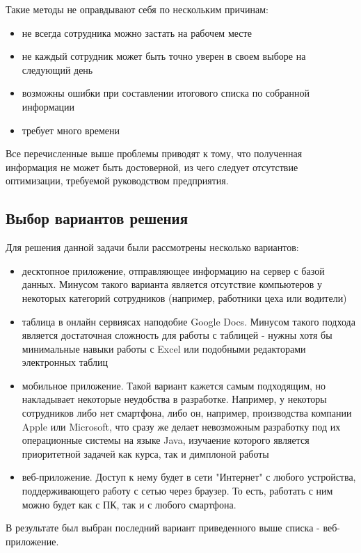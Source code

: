 \documentclass[a4paper]{article}
\begin{document}
Такие методы не оправдывают себя по нескольким причинам:
\begin{itemize}
\setlength{\itemsep}{-2mm}
	\item не всегда сотрудника можно застать на рабочем месте
	\item не каждый сотрудник может быть точно уверен в своем выборе на следующий день
	\item возможны ошибки при составлении итогового списка по собранной информации
	\item требует много времени
\end{itemize}

Все перечисленные выше проблемы приводят к тому, что полученная информация не может быть достоверной, из чего следует отсутствие оптимизации, требуемой руководством предприятия.

\subsection{Выбор вариантов решения}
Для решения данной задачи были рассмотрены несколько вариантов:
\begin{itemize}
\setlength{\itemsep}{-2mm}
	\item десктопное приложение, отправляющее информацию на сервер с базой данных. Минусом такого варианта является отсутствие компьютеров у некоторых категорий сотрудников (например, работники цеха или водители)
	\item таблица в онлайн сервиясах наподобие Google Docs. Минусом такого подхода является достаточная сложность для работы с таблицей - нужны хотя бы минимальные навыки работы с Excel или подобными редакторами электронных таблиц
	\item мобильное приложение. Такой вариант кажется самым подходящим, но накладывает некоторые неудобства в разработке. Например, у некоторы сотрудников либо нет смартфона, либо он, например, производства компании Apple или Microsoft, что сразу же делает невозможным разработку под их операционные системы на языке Java, изучаение которого является приоритетной задачей как курса, так и димплоной работы
	\item веб-приложение. Доступ к нему будет в сети "Интернет" с любого устройства, поддерживающего работу с сетью через браузер. То есть, работать с ним можно будет как с ПК, так и с любого смартфона.
\end{itemize}

В результате был выбран последний вариант приведенного выше списка - веб-приложение.
\end{document}

